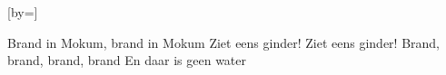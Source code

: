  

[by=]




\beginverse
Brand in Mokum, brand in Mokum
Ziet eens ginder! Ziet eens ginder!
Brand, brand, brand, brand
En daar is geen water
\endverse




\endsong
